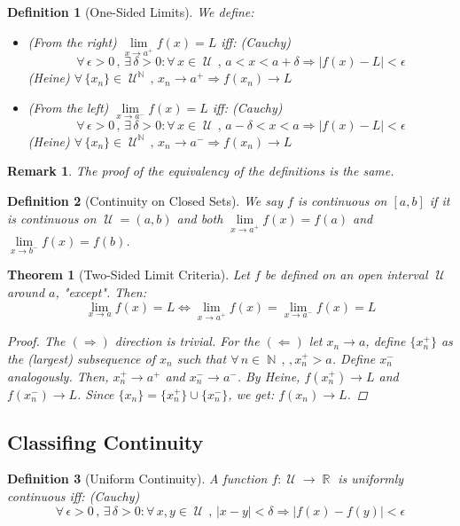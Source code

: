 \documentclass[12pt]{article}
\let\RA\Rightarrow
\let\LA\Leftarrow
\let\LR\Leftrightarrow
\newcommand{\Forall}[1]{\forall\,{#1}\,,\,}
\newcommand{\Exist}[1]{\exists\,{#1}:}
\DeclareMathOperator{\N}{\mathbb{N}}
\DeclareMathOperator{\R}{\mathbb{R}}
\DeclareMathOperator{\U}{\mathcal{U}}
\newtheorem{theorem}{Theorem}[subsection]
\newtheorem{definition}{Definition}[subsection]
\newtheorem{remark}{Remark}[subsection]
\begin{document}
\begin{definition}[One-Sided Limits]
  We define:
  \begin{itemize}
    \item[] (From the right) $\lim\limits_{x\to a^{+}}f(x)=L$ iff: (Cauchy) $$\Forall{\epsilon>0}\Exist{\delta>0}\Forall{x\in\U}a<x<a+\delta\RA |f(x)-L|<\epsilon$$
    (Heine) $\Forall{\{x_n\}\in \U^{\N}} x_n\to a^{+} \RA f(x_n)\to L$
    \item[] (From the left) $\lim\limits_{x\to a^{-}}f(x)=L$ iff: (Cauchy) $$\Forall{\epsilon>0}\Exist{\delta>0}\Forall{x\in\U}a-\delta<x<a\RA |f(x)-L|<\epsilon$$
    (Heine) $\Forall{\{x_n\}\in \U^{\N}} x_n\to a^{-} \RA f(x_n)\to L$
  \end{itemize}
\end{definition}

\begin{remark}
  The proof of the equivalency of the definitions is the same.
\end{remark}

\begin{definition}[Continuity on Closed Sets]
  We say $f$ is continuous on $[a,b]$ if it is continuous on $\U=(a,b)$ and both $\lim\limits_{x\to a^{+}}f(x)=f(a)$ and $\lim\limits_{x\to b^{-}}f(x)=f(b)$.
\end{definition}

\begin{theorem}[Two-Sided Limit Criteria]
  Let $f$ be defined on an open interval $\U$ around $a$, "except". Then:
  $$\lim\limits_{x\to a}f(x)=L\LR \lim\limits_{x\to a^{+}}f(x)=\lim\limits_{x\to a^{-}}f(x)=L$$
  \begin{proof}
    The $(\RA)$ direction is trivial. For the $(\LA)$ let $x_n\to a$, define $\{x^{+}_n\}$ as the (largest) subsequence of $x_n$ such that $\Forall{n\in\N},x^{+}_n>a$. Define $x^{-}_n$ analogously. Then, $x^{+}_n\to a^{+}$ and $x^{-}_n\to a^{-}$. By Heine, $f(x^{+}_n)\to L$ and $f(x^{-}_n)\to L$. Since $\{x_n\}=\{x^{+}_n\}\cup\{x^{-}_n\}$, we get: $f(x_n)\to L$.
  \end{proof}
\end{theorem}

\pagebreak

\subsection{Classifing Continuity}

\begin{definition}[Uniform Continuity]
  A function $f:\U\to\R$ is uniformly continuous iff: (Cauchy) $$\Forall{\epsilon>0}\Exist{\delta >0}\Forall{x,y\in\U} |x-y|<\delta \RA |f(x)-f(y)|<\epsilon$$ 
\end{definition}
\end{document}
